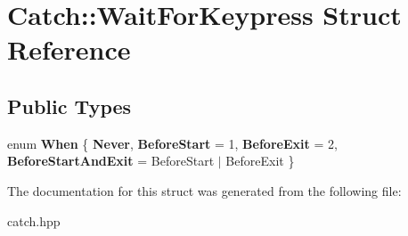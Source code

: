 \hypertarget{structCatch_1_1WaitForKeypress}{}\section{Catch\+:\+:Wait\+For\+Keypress Struct Reference}
\label{structCatch_1_1WaitForKeypress}
\subsection*{Public Types}
\begin{DoxyCompactItemize}
\item 
\mbox{\label{structCatch_1_1WaitForKeypress_a2e8c4369d0a605d64e3e83b5af3399ba}} 
enum {\bfseries When} \{ {\bfseries Never}, 
{\bfseries Before\+Start} = 1, 
{\bfseries Before\+Exit} = 2, 
{\bfseries Before\+Start\+And\+Exit} = Before\+Start $\vert$ Before\+Exit
 \}
\end{DoxyCompactItemize}


The documentation for this struct was generated from the following file\+:\begin{DoxyCompactItemize}
\item 
catch.\+hpp\end{DoxyCompactItemize}
